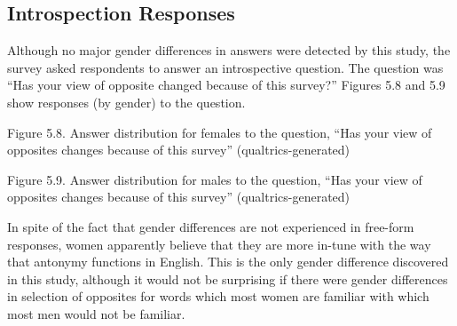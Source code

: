 \subsection {Introspection Responses} Although no major gender differences in answers were detected by this study, the survey asked respondents to answer an introspective question.  The question was “Has your view of opposite changed because of this survey?”  Figures 5.8 and 5.9 show responses (by gender) to the question.  

Figure 5.8. Answer distribution for females to the question, “Has your view of opposites changes because of this survey” (qualtrics-generated)

  Figure 5.9. Answer distribution for males to the question, “Has your view of opposites changes because of this survey” (qualtrics-generated)

In spite of the fact that gender differences are not experienced in free-form responses, women apparently believe that they are more in-tune with the way that antonymy functions in English.  This is the only gender difference discovered in this study, although it would not be surprising if there were gender differences in selection of opposites for words which most women are familiar with which most men would not be familiar.